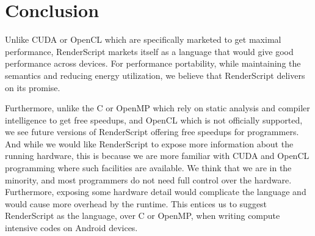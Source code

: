 \section{Conclusion}
\label{sec:conclusion}

Unlike CUDA or OpenCL which are specifically marketed to get maximal performance, 
RenderScript markets itself as a language that would give good performance across devices.
For performance portability, while maintaining the semantics and reducing energy utilization,
	we believe that RenderScript delivers on its promise.

Furthermore, unlike the C or OpenMP which rely on static analysis and compiler
	intelligence to get free speedups, and OpenCL which is not officially supported,
	we see future versions of RenderScript offering free speedups for programmers.
And while we would like RenderScript to expose more information about the running hardware,
	this is because we are more familiar with CUDA and OpenCL programming where such facilities
	are available.
We think that we are in the minority, and most programmers do not need full control over the hardware.
Furthermore, exposing some hardware detail would complicate the language and would cause
	more overhead by the runtime.
This entices us to suggest RenderScript as the language, over C or OpenMP, when writing compute intensive
	codes on Android devices.
